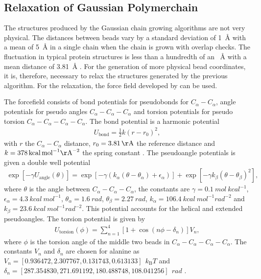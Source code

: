 \documentclass[12pt, twoside]{report}
\begin{document}
\subsection{Relaxation of Gaussian Polymerchain} The structures produced by
the Gaussian chain growing algorithms are not very physical. The distances
between beads vary by a standard deviation of \SI{1}{\AA} with a mean of
\SI{5}{\AA} in a single chain when the chain is grown with overlap checks. The
fluctuation in typical protein structures is less than a hundredth of an
\SI{}{\angstrom} with a mean distance of \SI{3.81}{\AA} \cite{Best2005}. For the
generation of more physical bead coordinates, it is, therefore, necessary to
relax the structures generated by the previous algorithm. For the relaxation,
the force field developed by \citet{Kim2008} can be used.

The forcefield consists of bond potentials for pseudobonds for
\(C_\alpha\!-\!C_\alpha\), angle potentials for pseudo angles
\(C_\alpha\!-\!C_\alpha\!-\!C_\alpha\) and torsion potentials for pseudo torsion
\(C_\alpha\!-\!C_\alpha\!-\!C_\alpha\!-\!C_\alpha\). The bond potential is a
harmonic potential
\begin{align} U_{\mathrm{bond}} = \frac{1}{2} k (r-r_0)^2,
\end{align} with \(r\) the \(C_\alpha\!-\!C_\alpha\) distance,
\(r_0=\SI{3.81}{\AA}\) the reference distance and \(k=\SI{378}{kcal ~ mol^{-1}
\AA^{-2}}\) the spring constant \cite{Karanicolas2002}. The pseudoangle
potentials is given a double well potential \cite{Best2005}
\begin{align} \exp[-\gamma U_{\mathrm{angle}}(\theta)] =
\exp[-\gamma(k_\alpha(\theta - \theta_\alpha)+\epsilon_\alpha)] + \exp[-\gamma
k_\beta(\theta - \theta_\beta)^2],
\end{align} where \(\theta\) is the angle between
\(C_\alpha\!-\!C_\alpha\!-\!C_\alpha\), the constants are
\(\gamma=\SI{0.1}{mol~kcal^{-1}}\), \(\epsilon_\alpha=\SI{4.3}{kcal ~
mol^{-1}}\), \(\theta_\alpha=\SI{1.6}{rad}\), \(\theta_\beta=\SI{2.27}{rad}\),
\(k_\alpha=\SI{106.4}{kcal ~ mol^{-1} rad^{-2}}\) and \(k_\beta=\SI{23.6}{kcal ~
mol^{-1} rad^{-2}}\). This potential accounts for the helical and extended
pseudoangles. The torsion potential is given by \cite{Karanicolas2002}
\begin{align} U_{\mathrm{torsion}}(\phi) = \sum_{n=1}^4 [1 + \cos(n\phi -
\delta_n)] V_n,
\end{align} where \(\phi\) is the torsion angle of the middle two beads in
\(C_\alpha\!-\!C_\alpha\!-\!C_\alpha\!-\!C_\alpha\). The constants \(V_n\) and
\(\delta_n\) are chosen for alanine as \(V_n=[0.936472, 2.307767, 0.131743
,0.613133]~\SI{}{k_{\mathrm{B}}T}\) and \(\delta_n=[287.354830,271.691192
,180.488748 ,108.041256]~\SI{}{rad}\) \cite{Karanicolas2002}.
\end{document}
